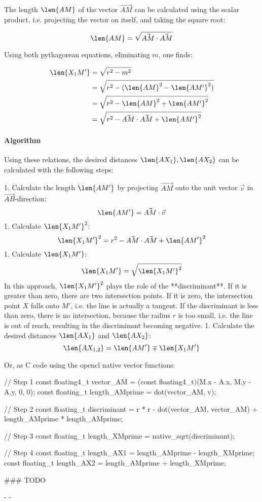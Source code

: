 The length $\len{AM}$ of the vector $\vec{AM}$ can be calculated using the scalar product, i.e. projecting the vector on itself, and taking the square root:

\begin{equation} \len{AM} = \sqrt{\vec{AM} \cdot \vec{AM}} \end{equation}

Using both pythagorean equations, eliminating $m$, one finds:

\begin{equation}\begin{split}
  \len{X_1 M'} &= \sqrt{r^2 - m^2} \\
    &= \sqrt{r^2 - (\len{AM}^2 - \len{AM'}^2)} \\
    &= \sqrt{r^2 - \len{AM}^2 + \len{AM'}^2} \\
    &= \sqrt{r^2 - \vec{AM} \cdot \vec{AM} + \len{AM'}^2}
\end{split}\end{equation}

\paragraph{Algorithm} Using these relations, the desired distances $\len{AX_1}, \len{AX_2}$ can be calculated with the following steps:

1. Calculate the length $\len{AM'}$ by projecting $\vec{AM}$ onto the unit vector $\vec{v}$ in $\vec{AB}$-direction: $$ \len{AM'} = \vec{AM} \cdot \vec{v} $$
1. Calculate $\len{X_1M'}^2$: $$ \len{X_1 M'}^2 = r^2 - \vec{AM} \cdot \vec{AM} + \len{AM'}^2 $$
1. Calculate $\len{X_1M'}$: $$ \len{X_1 M'} = \sqrt{\len{X_1 M'}^2} $$ In this approach, $\len{X_1M'}^2$ plays the role of the **discriminant**. If it is greater than zero, there are two intersection points. If it is zero, the intersection point $X$ falls onto $M'$, i.e. the line is actually a tangent. If the discriminant is less than zero, there is no intersection, because the radius $r$ is too small, i.e. the line is out of reach, resulting in the discriminant becoming negative.
1. Calculate the desired distances $\len{AX_1}$ and $\len{AX_2}$: $$ \len{A X_{1,2}} = \len{A M'} \mp \len{X_1 M'} $$

Or, as C code using the opencl native vector functions:

\begin{ccode}
  // Step 1
  const floating4_t vector_AM = (const floating4_t)(M.x - A.x, M.y - A.y, 0, 0);
  const floating_t length_AMprime = dot(vector_AM, v);

  // Step 2
  const floating_t discriminant = r * r - dot(vector_AM, vector_AM) + length_AMprime * length_AMprime;

  // Step 3
  const floating_t length_XMprime = native_sqrt(discriminant);

  // Step 4
  const floating_t length_AX1 = length_AMprime - length_XMprime;
  const floating_t length_AX2 = length_AMprime + length_XMprime;
\end{ccode}


### TODO

- 
- 


